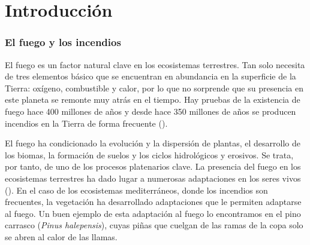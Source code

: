 \documentclass[12pt,a4paper,]{book}
\title{}
\author{Nombre Completo Autor}
\date{18/11/2021}
\def\ifdoblecara{} %
\def\ifprincipal{} %
\let\ifprincipal\undefined %
\numberwithin{dummy}{section}
\theoremstyle{ocrenumbox}
\theoremstyle{blacknumex}
\theoremstyle{blacknumbox}
\theoremstyle{ocrenum}
\theoremstyle{ocrenum}
\begin{document}




\raggedbottom

\ifdefined\ifprincipal
\else
\setlength{\parindent}{1em}
\pagestyle{fancy}
\setcounter{tocdepth}{4}
\tableofcontents

\fi

\ifdefined\ifdoblecara
\fancyhead{}{}
\fancyhead[LE,RO]{\scriptsize\rightmark}
\fancyfoot[LO,RE]{\scriptsize\slshape \leftmark}
\fancyfoot[C]{}
\fancyfoot[LE,RO]{\footnotesize\thepage}
\else
\fancyhead{}{}
\fancyhead[RO]{\scriptsize\rightmark}
\fancyfoot[LO]{\scriptsize\slshape \leftmark}
\fancyfoot[C]{}
\fancyfoot[RO]{\footnotesize\thepage}
\fi

\renewcommand{\headrulewidth}{0.4pt}
\renewcommand{\footrulewidth}{0.4pt}

\hypertarget{introducciuxf3n}{%
\chapter{Introducción}\label{introducciuxf3n}}

\hypertarget{el-fuego-y-los-incendios}{%
\subsection*{El fuego y los incendios}\label{el-fuego-y-los-incendios}}

El fuego es un factor natural clave en los ecosistemas terrestres. Tan
solo necesita de tres elementos básico que se encuentran en abundancia
en la superficie de la Tierra: oxígeno, combustible y calor, por lo que
no sorprende que su presencia en este planeta se remonte muy atrás en el
tiempo. Hay pruebas de la existencia de fuego hace 400 millones de años
y desde hace 350 millones de años se producen incendios en la Tierra de
forma frecuente (\citet{ScottGlasspool}).

El fuego ha condicionado la evolución y la dispersión de plantas, el
desarrollo de los biomas, la formación de suelos y los ciclos
hidrológicos y erosivos. Se trata, por tanto, de uno de los procesos
platenarios clave. La presencia del fuego en los ecosistemas terrestres
ha dado lugar a numerosas adaptaciones en los seres vivos
(\citet{MataixCerda}). En el caso de los ecosistemas mediterráneos,
donde los incendios son frecuentes, la vegetación ha desarrollado
adaptaciones que le permiten adaptarse al fuego. Un buen ejemplo de esta
adaptación al fuego lo encontramos en el pino carrasco (\emph{Pinus
halepensis}), cuyas piñas que cuelgan de las ramas de la copa solo se
abren al calor de las llamas.
\end{document}
